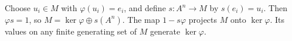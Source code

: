 Choose $u_i\in M$ with $\varphi(u_i)=e_i$, and define $s:A^n\to M$ by $s(e_i)=u_i$. Then $\varphi s=1$, so $M=\ker\varphi\oplus s(A^n)$. The map $1-s\varphi$ projects $M$ onto $\ker\varphi$. Its values on any finite generating set of $M$ generate $\ker\varphi$.
